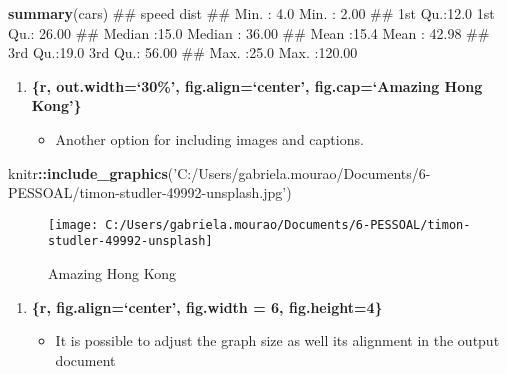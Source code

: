 \documentclass[]{article}
\newenvironment{Shaded}{\begin{snugshade}}{\end{snugshade}}
\newcommand{\KeywordTok}[1]{\textcolor[rgb]{0.13,0.29,0.53}{\textbf{#1}}}
\newcommand{\StringTok}[1]{\textcolor[rgb]{0.31,0.60,0.02}{#1}}
\newcommand{\OperatorTok}[1]{\textcolor[rgb]{0.81,0.36,0.00}{\textbf{#1}}}
\newcommand{\NormalTok}[1]{#1}
\providecommand{\tightlist}{%
  \setlength{\itemsep}{0pt}\setlength{\parskip}{0pt}}
\begin{document}
\begin{Shaded}
\begin{Highlighting}[]
\KeywordTok{summary}\NormalTok{(cars)}
\NormalTok{##      speed           dist       }
\NormalTok{##  Min.   : 4.0   Min.   :  2.00  }
\NormalTok{##  1st Qu.:12.0   1st Qu.: 26.00  }
\NormalTok{##  Median :15.0   Median : 36.00  }
\NormalTok{##  Mean   :15.4   Mean   : 42.98  }
\NormalTok{##  3rd Qu.:19.0   3rd Qu.: 56.00  }
\NormalTok{##  Max.   :25.0   Max.   :120.00}
\end{Highlighting}
\end{Shaded}

\begin{enumerate}
\def\labelenumi{\arabic{enumi}.}
\setcounter{enumi}{4}
\tightlist
\item
  \textbf{\{r, out.width=`30\%', fig.align=`center', fig.cap=`Amazing
  Hong Kong'\}}

  \begin{itemize}
  \tightlist
  \item
    Another option for including images and captions.
  \end{itemize}
\end{enumerate}

\begin{Shaded}
\begin{Highlighting}[]
\NormalTok{knitr}\OperatorTok{::}\KeywordTok{include_graphics}\NormalTok{(}\StringTok{'C:/Users/gabriela.mourao/Documents/6-PESSOAL/timon-studler-49992-unsplash.jpg'}\NormalTok{)}
\end{Highlighting}
\end{Shaded}

\begin{figure}

{\centering \texttt{[image: C:/Users/gabriela.mourao/Documents/6-PESSOAL/timon-studler-49992-unsplash]} 

}

\caption{Amazing Hong Kong}\label{fig:unnamed-chunk-6}
\end{figure}

\begin{enumerate}
\def\labelenumi{\arabic{enumi}.}
\setcounter{enumi}{5}
\tightlist
\item
  \textbf{\{r, fig.align=`center', fig.width = 6, fig.height=4\}}

  \begin{itemize}
  \tightlist
  \item
    It is possible to adjust the graph size as well its alignment in the
    output document
  \end{itemize}
\end{enumerate}
\end{document}
